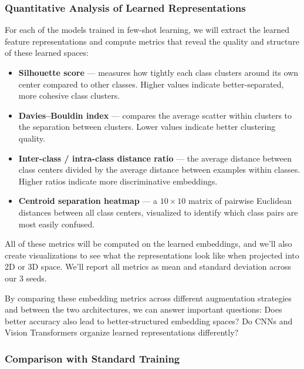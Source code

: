 \documentclass[12pt,a4paper]{article}
\begin{document}
\subsubsection{Quantitative Analysis of Learned Representations}

For each of the models trained in few-shot learning, we will extract the learned feature representations and compute metrics that reveal the quality and structure of these learned spaces:

\begin{itemize}[nosep]
    \item \textbf{Silhouette score} --- measures how tightly each class clusters around its own center compared to other classes. Higher values indicate better-separated, more cohesive class clusters.
    
    \item \textbf{Davies--Bouldin index} --- compares the average scatter within clusters to the separation between clusters. Lower values indicate better clustering quality.
    
    \item \textbf{Inter-class / intra-class distance ratio} --- the average distance between class centers divided by the average distance between examples within classes. Higher ratios indicate more discriminative embeddings.
    
    \item \textbf{Centroid separation heatmap} --- a $10 \times 10$ matrix of pairwise Euclidean distances between all class centers, visualized to identify which class pairs are most easily confused.
\end{itemize}

All of these metrics will be computed on the learned embeddings, and we'll also create visualizations to see what the representations look like when projected into 2D or 3D space. We'll report all metrics as mean and standard deviation across our 3 seeds.

By comparing these embedding metrics across different augmentation strategies and between the two architectures, we can answer important questions: Does better accuracy also lead to better-structured embedding spaces? Do CNNs and Vision Transformers organize learned representations differently?

\subsubsection{Comparison with Standard Training}
\end{document}
